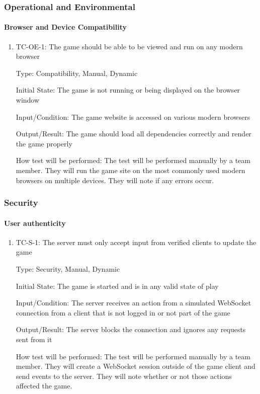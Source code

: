 \documentclass[12pt, titlepage]{article}
\begin{document}
\subsubsection{Operational and Environmental}

\paragraph{Browser and Device Compatibility}

\begin{enumerate}

\item{TC-OE-1: The game should be able to be viewed and run on any modern browser}

Type: Compatibility, Manual, Dynamic
					
Initial State: The game is not running or being displayed on the browser window
					
Input/Condition: The game website is accessed on various modern browsers
					
Output/Result: The game should load all dependencies correctly and render the game properly
					
How test will be performed: The test will be performed manually by a team member. They will run the game site on the most commonly used modern browsers on multiple devices. They will note if any errors occur.

\end{enumerate}

\subsubsection{Security}

\paragraph{User authenticity}

\begin{enumerate}
\item{TC-S-1: The server must only accept input from verified clients to update the game}

Type: Security, Manual, Dynamic
					
Initial State: The game is started and is in any valid state of play
					
Input/Condition: The server receives an action from a simulated WebSocket connection from a client that is not logged in or not part of the game
					
Output/Result: The server blocks the connection and ignores any requests sent from it
					
How test will be performed: The test will be performed manually by a team member. They will create a WebSocket session outside of the game client and send events to the server. They will note whether or not those actions affected the game.
\end{enumerate}
\end{document}
